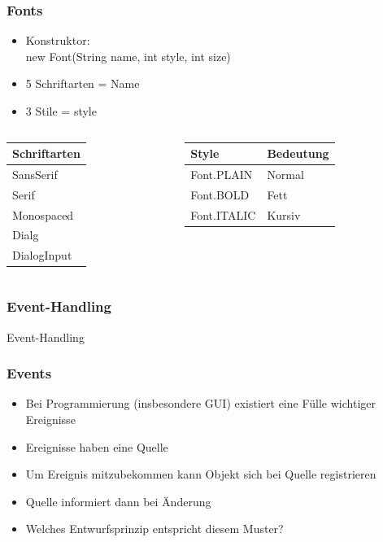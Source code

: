 \begin{frame}[fragile]
	\frametitle{Fonts}
		\begin{center}
			\begin{itemize}
			  \item Konstruktor:\\
			  new Font(String name, int style, int size)
			  \item 5 Schriftarten = Name
			  \item 3 Stile = style
			\end{itemize}
		\end{center}
	\begin{columns}
		\begin{column}{0.5\textwidth}
			\begin{table}
			\begin{tabular}{l}
			 Schriftarten \\ \hline
			SansSerif\\
					Serif\\
					Monospaced\\
					Dialg\\
					DialogInput
			\end{tabular}
			\end{table}
		\end{column}
		\begin{column}{0.5\textwidth}
			\begin{table}
			\begin{tabular}{l|l}
			Style & Bedeutung \\ \hline
					Font.PLAIN & Normal\\
					Font.BOLD & Fett\\
					Font.ITALIC & Kursiv
			\end{tabular}
			\end{table}
		\end{column}
	\end{columns}
\end{frame}

\begin{frame}[fragile]
	\frametitle{Event-Handling}
	\huge Event-Handling
\end{frame} 

\begin{frame}[fragile]
	\frametitle{Events}
	\begin{itemize}
	  \item Bei Programmierung (insbesondere GUI)
	  existiert eine F\"ulle wichtiger Ereignisse
	  \item Ereignisse haben eine Quelle
	  \item Um Ereignis mitzubekommen kann Objekt
	  sich bei Quelle registrieren
	  \item Quelle informiert dann bei \"Anderung
	  \item Welches Entwurfsprinzip entspricht diesem Muster?
	\end{itemize}
\end{frame} 

